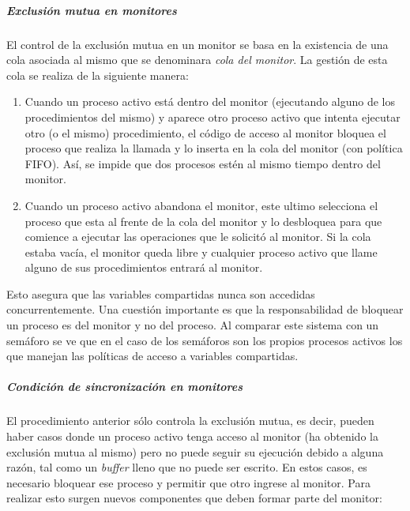 \subparagraph{Exclusión mutua en monitores}
\hfill
\par El control de la exclusión mutua en un monitor se basa en la existencia de una cola asociada al mismo que se denominara \textit{cola del monitor}. La gestión de esta cola se realiza de la siguiente manera:

\begin{enumerate}
    \item Cuando un proceso activo está dentro del monitor (ejecutando alguno de los procedimientos del mismo) y aparece otro proceso activo que intenta ejecutar otro (o el mismo) procedimiento, el código de acceso al monitor bloquea el proceso que realiza la llamada y lo inserta en la cola del monitor (con política FIFO). Así, se impide que dos procesos estén al mismo tiempo dentro del monitor.

    \item Cuando un proceso activo abandona el monitor, este ultimo selecciona el proceso que esta al frente de la cola del monitor y lo desbloquea para que comience a ejecutar las operaciones que le solicitó al monitor. Si la cola estaba vacía, el monitor queda libre y cualquier proceso activo que llame alguno de sus procedimientos entrará al monitor.
\end{enumerate}

Esto asegura que las variables compartidas nunca son accedidas concurrentemente. Una cuestión importante es que la responsabilidad de bloquear un proceso es del monitor y no del proceso.
Al comparar este sistema con un semáforo se ve que en el caso de los semáforos son los propios procesos activos los que manejan las políticas de acceso a variables compartidas.

\subparagraph{Condición de sincronización en monitores}
\hfill
\par El procedimiento anterior sólo controla la exclusión mutua, es decir, pueden haber casos donde un proceso activo tenga acceso al monitor (ha obtenido la exclusión mutua al mismo) pero no puede seguir su ejecución debido a alguna razón, tal como un \textit{buffer} lleno que no puede ser escrito. En estos casos, es necesario bloquear ese proceso y permitir que otro ingrese al monitor. Para realizar esto surgen nuevos componentes que deben formar parte del monitor:

